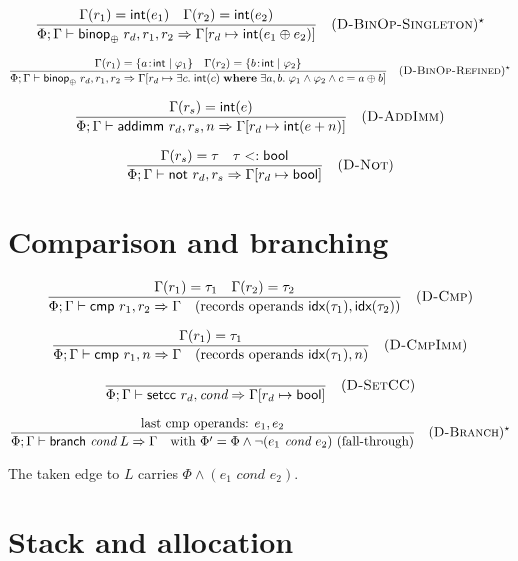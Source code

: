 $$
  \frac{
    \Gamma(r_1) = \textsf{int}(e_1) \quad \Gamma(r_2) = \textsf{int}(e_2)
  }{\Phi; \Gamma \vdash \textsf{binop}_\oplus\; r_d, r_1, r_2 \Rightarrow \Gamma[r_d \mapsto \textsf{int}(e_1 \oplus e_2)]} \quad (\textsc{D-BinOp-Singleton})^\star
$$

$$
  \frac{
    \Gamma(r_1) = \{a\!:\!\textsf{int} \mid \varphi_1\} \quad \Gamma(r_2) = \{b\!:\!\textsf{int} \mid \varphi_2\}
  }{\Phi; \Gamma \vdash \textsf{binop}_\oplus\; r_d, r_1, r_2 \Rightarrow \Gamma[r_d \mapsto \exists c.\; \textsf{int}(c) \;\mathbf{where}\; \exists a,b.\; \varphi_1 \wedge \varphi_2 \wedge c = a \oplus b]} \quad (\textsc{D-BinOp-Refined})^\star
$$

$$
  \frac{
    \Gamma(r_s) = \textsf{int}(e)
  }{\Phi; \Gamma \vdash \textsf{addimm } r_d, r_s, n \Rightarrow \Gamma[r_d \mapsto \textsf{int}(e + n)]} \quad (\textsc{D-AddImm})
$$

$$
  \frac{
    \Gamma(r_s) = \tau \quad \tau <: \textsf{bool}
  }{\Phi; \Gamma \vdash \textsf{not } r_d, r_s \Rightarrow \Gamma[r_d \mapsto \textsf{bool}]} \quad (\textsc{D-Not})
$$

\section*{Comparison and branching}

$$
  \frac{
    \Gamma(r_1) = \tau_1 \quad \Gamma(r_2) = \tau_2
  }{\Phi; \Gamma \vdash \textsf{cmp } r_1, r_2 \Rightarrow \Gamma \quad \text{(records operands } \textsf{idx}(\tau_1), \textsf{idx}(\tau_2)\text{)}} \quad (\textsc{D-Cmp})
$$

$$
  \frac{
    \Gamma(r_1) = \tau_1
  }{\Phi; \Gamma \vdash \textsf{cmp } r_1, n \Rightarrow \Gamma \quad \text{(records operands } \textsf{idx}(\tau_1), n\text{)}} \quad (\textsc{D-CmpImm})
$$

$$
  \frac{}{\Phi; \Gamma \vdash \textsf{setcc } r_d, \textit{cond} \Rightarrow \Gamma[r_d \mapsto \textsf{bool}]} \quad (\textsc{D-SetCC})
$$

$$
  \frac{
    \text{last cmp operands: } e_1, e_2
  }{\Phi; \Gamma \vdash \textsf{branch } \textit{cond}\; L \Rightarrow \Gamma \quad \text{with } \Phi' = \Phi \wedge \neg(e_1 \textit{ cond } e_2) \text{ (fall-through)}} \quad (\textsc{D-Branch})^\star
$$

\noindent The taken edge to $L$ carries $\Phi \wedge (e_1 \textit{ cond } e_2)$.

\section*{Stack and allocation}

